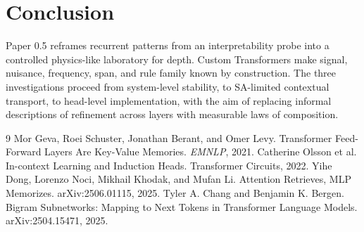 \documentclass[10pt]{article}
\begin{document}
\section{Conclusion}
Paper 0.5 reframes recurrent patterns from an interpretability probe into a controlled physics-like laboratory for depth. Custom Transformers make signal, nuisance, frequency, span, and rule family known by construction. The three investigations proceed from system-level stability, to SA-limited contextual transport, to head-level implementation, with the aim of replacing informal descriptions of refinement across layers with measurable laws of composition.

\begin{thebibliography}{9}
 Mor Geva, Roei Schuster, Jonathan Berant, and Omer Levy. Transformer Feed-Forward Layers Are Key-Value Memories. \emph{EMNLP}, 2021.
 Catherine Olsson et al. In-context Learning and Induction Heads. Transformer Circuits, 2022.
 Yihe Dong, Lorenzo Noci, Mikhail Khodak, and Mufan Li. Attention Retrieves, MLP Memorizes. arXiv:2506.01115, 2025.
 Tyler A. Chang and Benjamin K. Bergen. Bigram Subnetworks: Mapping to Next Tokens in Transformer Language Models. arXiv:2504.15471, 2025.
\end{thebibliography}
\end{document}
